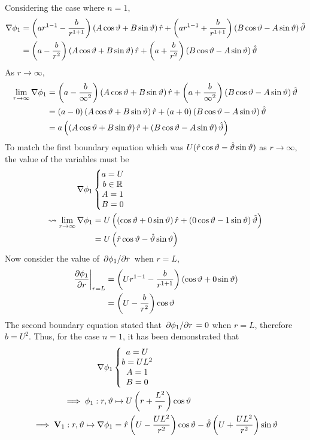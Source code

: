 Considering the case where $n=1$,
\begin{align*}
    \nabla\phi_1&=\left(ar^{1-1}-\frac{b}{r^{1+1}}\right)\left(A\cos\vartheta+B\sin\vartheta\right)\hat{r}+\left(ar^{1-1}+\frac{b}{r^{1+1}}\right)\left(B\cos\vartheta-A\sin\vartheta\right)\hat{\vartheta}\\
    &=\left(a-\frac{b}{r^{2}}\right)\left(A\cos\vartheta+B\sin\vartheta\right)\hat{r}+\left(a+\frac{b}{r^{2}}\right)\left(B\cos\vartheta-A\sin\vartheta\right)\hat{\vartheta}
\end{align*}
As $r\rightarrow\infty$,
\begin{align*}
    \lim_{r\rightarrow\infty}\nabla\phi_1&=\left(a-\frac{b}{\infty^2}\right)\left(A\cos\vartheta+B\sin\vartheta\right)\hat{r}+\left(a+\frac{b}{\infty^2}\right)\left(B\cos\vartheta-A\sin\vartheta\right)\hat{\vartheta}\\
    &=\left(a-0\right)\left(A\cos\vartheta+B\sin\vartheta\right)\hat{r}+\left(a+0\right)\left(B\cos\vartheta-A\sin\vartheta\right)\hat{\vartheta}\\
    &=a\left(\left(A\cos\vartheta+B\sin\vartheta\right)\hat{r}+\left(B\cos\vartheta-A\sin\vartheta\right)\hat{\vartheta}\right)
\end{align*}
To match the first boundary equation which was $U(\hat{r}\cos\vartheta-\hat{\vartheta}\sin\vartheta)$ as $r\rightarrow\infty$, the value of the variables must be
\begin{align*}
    \nabla\phi_1&\left\{\begin{matrix}
        a=U\\
        b\in\mathbb{R}\\
        A=1\\
        B=0
    \end{matrix}\right.\\
    \leadsto\lim_{r\rightarrow\infty}\nabla\phi_1&=U\left(\left(\cos\vartheta+0\sin\vartheta\right)\hat{r}+\left(0\cos\vartheta-1\sin\vartheta\right)\hat{\vartheta}\right)\\
    &=U\left(\hat{r}\cos\vartheta-\hat{\vartheta}\sin\vartheta\right)
\end{align*}
Now consider the value of $\pdv*{\phi_1}{r}$ when $r=L$,
\begin{align*}
    \eval{\pdv{\phi_1}{r}}_{r=L}&=\left(Ur^{1-1}-\frac{b}{r^{1+1}}\right)\left(\cos\theta+0\sin\theta\right)\\
    &=\left(U-\frac{b}{r^{2}}\right)\cos\theta
\end{align*}
The second boundary equation stated that $\pdv*{\phi_1}{r}=0$ when $r=L$, therefore $b=U^2$. Thus, for the case $n=1$, it has been demonstrated that
\begin{align*}
    \nabla\phi_1&\left\{\begin{matrix}
        a=U\\
        b=UL^2\\
        A=1\\
        B=0
    \end{matrix}\right.\\
    \implies\phi_1:r,\vartheta&\mapsto U\left(r+\frac{L^2}{r}\right)\cos\vartheta\\
    \implies\mathbf{V}_1:r,\vartheta\mapsto\nabla\phi_1&=\hat{r}\left(U-\frac{UL^2}{r^{2}}\right)\cos\vartheta-\hat{\vartheta}\left(U+\frac{UL^2}{r^{2}}\right)\sin\vartheta
\end{align*}
